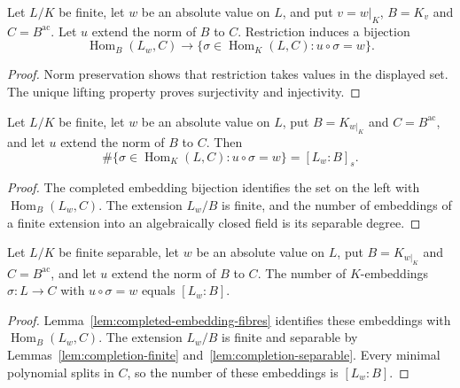\begin{lemma}\label{lem:completed-embedding-fibres}
\leanok
{}
Let $L/K$ be finite, let $w$ be an absolute value on $L$, and put
$v=w|_K$, $B=K_v$ and $C=B^{\mathrm{ac}}$. Let $u$ extend the norm of
$B$ to $C$. Restriction induces a bijection
\[
 \operatorname{Hom}_B(L_w,C)\longrightarrow
 \{\sigma\in\operatorname{Hom}_K(L,C):u\circ\sigma=w\}.
\]
\end{lemma}
\begin{proof}
Norm preservation shows that restriction takes values in the displayed set.
The unique lifting property proves surjectivity and injectivity.
\end{proof}

\begin{lemma}
\label{lem:completed-separable-embedding-count}
\leanok
{}
Let $L/K$ be finite, let $w$ be an absolute value on $L$, put
$B=K_{w|_K}$ and $C=B^{\mathrm{ac}}$, and let $u$ extend the norm
of $B$ to $C$. Then
\[
 \#\{\sigma\in\operatorname{Hom}_K(L,C):u\circ\sigma=w\}
 =[L_w:B]_s.
\]
\end{lemma}
\begin{proof}
The completed embedding bijection identifies the set on the left
with $\operatorname{Hom}_B(L_w,C)$. The extension $L_w/B$ is finite,
and the number of embeddings of a finite extension into an
algebraically closed field is its separable degree.
\end{proof}

\begin{lemma}\label{lem:completed-embedding-count}
\leanok
{}
Let $L/K$ be finite separable, let $w$ be an absolute value on $L$,
put $B=K_{w|_K}$ and $C=B^{\mathrm{ac}}$, and let $u$ extend the
norm of $B$ to $C$. The number of $K$-embeddings $\sigma:L\to C$
with $u\circ\sigma=w$ equals $[L_w:B]$.
\end{lemma}
\begin{proof}
Lemma~\ref{lem:completed-embedding-fibres} identifies these embeddings
with $\operatorname{Hom}_B(L_w,C)$. The extension $L_w/B$ is finite
and separable by Lemmas~\ref{lem:completion-finite}
and~\ref{lem:completion-separable}. Every minimal polynomial splits
in $C$, so the number of these embeddings is $[L_w:B]$.
\end{proof}

